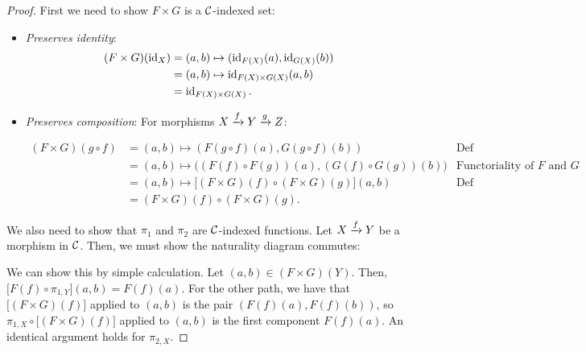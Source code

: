 \begin{proof}
First we need to show $F \times G$ is a $\mathcal C$-indexed set:
\begin{itemize}
  \item \emph{Preserves identity}: 
  \begin{align*}
  (F \times G)(\operatorname{id}_X) &= (a, b) \mapsto (\operatorname{id}_{F(X)}(a), \operatorname{id}_{G(X)}(b)) \\
  &=(a, b) \mapsto  \operatorname{id}_{F(X) \times G(X)} (a, b) \\
  &=\operatorname{id}_{F(X)\times G(X)}.
  \end{align*}
  \item \emph{Preserves composition}: For morphisms $X \xrightarrow{f} Y \xrightarrow{g} Z$:
  \begin{fullwidth}
   \begin{align*}
    (F \times G )(g \circ f) 
    &= (a,b) \mapsto (F(g \circ f)(a), G(g \circ f)(b)) & \text{Def} \\
    &= (a,b) \mapsto \big((F(f) \circ F(g))(a), (G(f) \circ G(g))(b)\big) & \text{Functoriality of $F$ and $G$} \\
    &= (a,b) \mapsto \big[ (F \times G)(f) \circ (F \times G) (g)\big](a,b) & \text{Def} \\
    &= (F \times G)(f) \circ (F \times G) (g).
  \end{align*}
   
  \end{fullwidth}
\end{itemize}

We also need to show that $\pi_1$ and $\pi_2$ are $\mathcal C$-indexed functions.
Let $X \xrightarrow{f} Y$ be a morphism in $\mathcal C$. Then, we must show the naturality
diagram commutes:

\begin{center}
\end{center}

We can show this by simple calculation.
Let $(a,b) \in (F \times G)(Y)$. Then, $\big[F(f) \circ \pi_{1,Y}\big](a,b)  = F(f)(a)$.
For the other path, we have that $\big[(F \times G)(f) \big]$ applied to $(a, b)$ is the pair $(F(f)(a), F(f)(b))$,
so $\pi_{1,X} \circ \big[(F \times G)(f) \big]$ applied to $(a, b)$ is the first component $F(f)(a)$.
An identical argument holds for $\pi_{2,X}$.


\end{proof}
